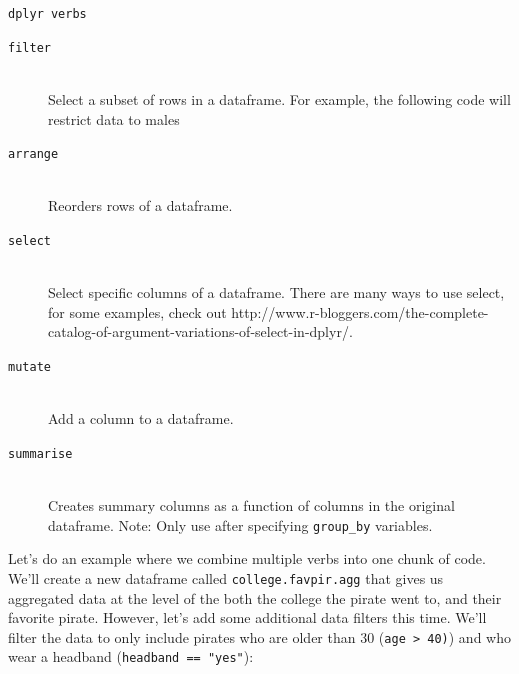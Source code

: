 \documentclass{tufte-book}\usepackage[]{graphicx}\usepackage[]{color}
\newcommand{\newfun}[1]{\begin{LARGE} \begin{center} \texttt{#1} \end{center} \end{LARGE}}
\begin{document}
\begin{footnotesize}
{{\newfun{dplyr verbs}

\hline

\begin{description}

\item[\tt{filter}] \hfill \\
Select a subset of rows in a dataframe. For example, the following code will restrict data to males

\item[\tt{arrange}] \hfill \\
  Reorders rows of a dataframe.
  
  \item[\tt{select}] \hfill \\  
Select specific columns of a dataframe. There are many ways to use select, for some examples, check out http://www.r-bloggers.com/the-complete-catalog-of-argument-variations-of-select-in-dplyr/.

\item[\tt{mutate}] \hfill \\  
Add a column to a dataframe. 

\item[\tt{summarise}] \hfill \\  
 Creates summary columns as a function of columns in the original dataframe. Note: Only use after specifying \texttt{group\_by} variables.

\end{description}

}
}
\vspace{5mm} %

Let's do an example where we combine multiple verbs into one chunk of code. We'll create a new dataframe called \texttt{college.favpir.agg} that gives us aggregated data at the level of the both the college the pirate went to, and their favorite pirate. However, let's add some additional data filters this time. We'll filter the data to only include pirates who are older than 30 (\texttt{age > 40)}) and who wear a headband (\texttt{headband == "yes"}):


\end{footnotesize}
\end{document}
